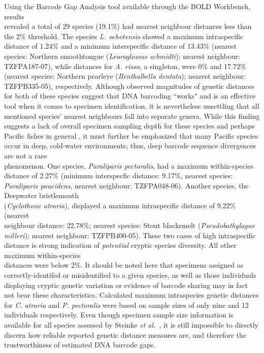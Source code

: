 Using the Barcode Gap Analysis tool available through the BOLD Workbench, results \\ revealed a total of 29 species (19.1\%) had nearest neighbour distances less than the 2\% threshold. The species \textit{L. ochotensis} showed a maximum intraspecific distance of 1.24\% and a minimum interspecific distance of 13.43\% (nearest species: Northern smoothtongue (\textit{Leuroglossus schmidti}); nearest neighbour: TZFPA187-07), while distances for \textit{A. risso}, a singleton, were 0\% and 17.72\% (nearest species: Northern pearleye (\textit{Benthalbella dentata}); nearest neighbour: TZFPB335-05), respectively. Although observed magnitudes of genetic distances for both of these species suggest that DNA barcoding ``works" and is an effective tool when it comes to specimen identification, it is nevertheless unsettling that all \\ mentioned species' nearest neighbours fall into separate genera. While this finding suggests a lack of overall specimen sampling depth for these species and perhaps Pacific fishes in general \cite{steinke2009dna}, it must further be emphasized that many Pacific species occur in deep, cold-water environments; thus, deep barcode sequence divergences are not a rare \\ phenomenon. One species, \textit{Paraliparis pectoralis}, had a maximum within-species distance of 2.27\% (minimum interspecfic distance: 9.17\%, nearest species: \textit{Paraliparis paucidens}, nearest neighbour: TZFPA048-06). Another species, the Deepwater bristlemouth \\ (\textit{Cyclothone atraria}), displayed a maximum intraspecific distance of 9.22\% (nearest \\ neighbour distance: 22.78\%; nearest species: Stout blacksmelt (\textit{Pseudobathylagus milleri}); nearest neighbour: TZFPB400-05). These two cases of high intraspecific distance is strong indication of \textit{potential} cryptic species diversity. All other maximum within-species \\ distances were below 2\%. It should be noted here that specimens assigned as \\ correctly-identifed or misidentified to a given species, as well as those individuals \\ displaying cryptic genetic variation or evidence of barcode sharing may in fact not bear these characteristics. Calculated maximum intraspecies genetic distances for \textit{C. atraria} and \textit{P. pectoralis} were based on sample sizes of only nine and 12 individuals respectively. Even though specimen sample size information is available for all species assessed by Steinke \textit{et al.}~\cite{steinke2009dna}, it is still impossible to directly discern how reliable reported genetic distance measures are, and therefore the trustworthiness of estimated DNA barcode gaps.



